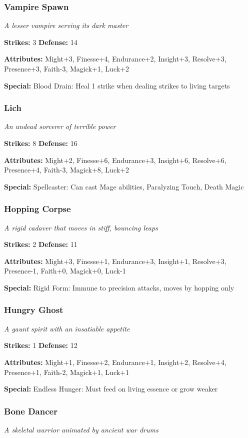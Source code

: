 \documentclass[10pt,twoside]{article}
\begin{document}
\subsubsection{Vampire Spawn}
\textit{A lesser vampire serving its dark master}

\textbf{Strikes:} 3 \quad \textbf{Defense:} 14

\textbf{Attributes:} Might+3, Finesse+4, Endurance+2, Insight+3, Resolve+3, Presence+3, Faith-3, Magick+1, Luck+2

\textbf{Special:} Blood Drain: Heal 1 strike when dealing strikes to living targets

\subsubsection{Lich}
\textit{An undead sorcerer of terrible power}

\textbf{Strikes:} 8 \quad \textbf{Defense:} 16

\textbf{Attributes:} Might+2, Finesse+6, Endurance+3, Insight+6, Resolve+6, Presence+4, Faith-3, Magick+8, Luck+2

\textbf{Special:} Spellcaster: Can cast Mage abilities, Paralyzing Touch, Death Magic

\subsubsection{Hopping Corpse}
\textit{A rigid cadaver that moves in stiff, bouncing leaps}

\textbf{Strikes:} 2 \quad \textbf{Defense:} 11

\textbf{Attributes:} Might+3, Finesse+1, Endurance+3, Insight+1, Resolve+3, Presence-1, Faith+0, Magick+0, Luck-1

\textbf{Special:} Rigid Form: Immune to precision attacks, moves by hopping only

\subsubsection{Hungry Ghost}
\textit{A gaunt spirit with an insatiable appetite}

\textbf{Strikes:} 1 \quad \textbf{Defense:} 12

\textbf{Attributes:} Might+1, Finesse+2, Endurance+1, Insight+2, Resolve+4, Presence+1, Faith-2, Magick+1, Luck+1

\textbf{Special:} Endless Hunger: Must feed on living essence or grow weaker

\subsubsection{Bone Dancer}
\textit{A skeletal warrior animated by ancient war drums}
\end{document}

